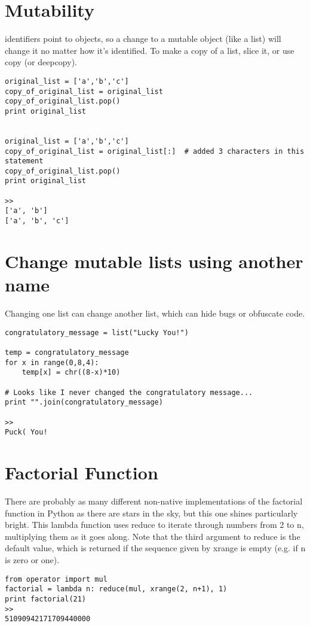 \documentclass[12pt,a4paper,final,twoside,onecolumn,titlepage]{book}
\begin{document}
\section{Mutability}
identifiers point to objects, so a change to a mutable object (like a list) will change it no matter how it's identified. To make a copy of a list, slice it, or use copy (or deepcopy).
\begin{lstlisting}
original_list = ['a','b','c']
copy_of_original_list = original_list
copy_of_original_list.pop()
print original_list


original_list = ['a','b','c']
copy_of_original_list = original_list[:]  # added 3 characters in this statement
copy_of_original_list.pop()
print original_list

>>
['a', 'b']
['a', 'b', 'c']
\end{lstlisting}

\section{Change mutable lists using another name}
Changing one list can change another list, which can hide bugs or obfuscate code.
\begin{lstlisting}
congratulatory_message = list("Lucky You!")

temp = congratulatory_message
for x in range(0,8,4):
    temp[x] = chr((8-x)*10)

# Looks like I never changed the congratulatory message...
print "".join(congratulatory_message)

>>
Puck( You!
\end{lstlisting}

\section{Factorial Function}
There are probably as many different non-native implementations of the factorial function in Python as there are stars in the sky, but this one shines particularly bright. This lambda function uses reduce to iterate through numbers from 2 to n, multiplying them as it goes along. Note that the third argument to reduce is the default value, which is returned if the sequence given by xrange is empty (e.g. if n is zero or one).
\begin{lstlisting}
from operator import mul
factorial = lambda n: reduce(mul, xrange(2, n+1), 1)
print factorial(21)
>>
51090942171709440000
\end{lstlisting}
\end{document}
